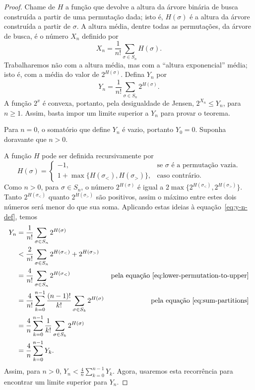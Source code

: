 \begin{proof}
    Chame de $H$ a função que devolve a altura da árvore binária de busca
    construída a partir de uma permutação dada;
    isto é, $H(\sigma)$ é a altura da árvore construída a partir de $\sigma$.
    A altura média,
    dentre todas as permutações,
    da árvore de busca,
    é o número $X_n$ definido por
    \begin{equation*}
        X_n = \frac{1}{n!} \sum_{\sigma \in S_n} H(\sigma).
    \end{equation*}
    Trabalharemos não com a altura média,
    mas com a ``altura exponencial'' média;
    isto é, com a média do valor de $2^{H(\sigma)}$.
    Defina $Y_n$ por
    \begin{equation}
        Y_n = \frac{1}{n!} \sum_{\sigma \in S_n} 2^{H(\sigma)}.
        \label{eq:y-n-def}
    \end{equation}
    A função $2^x$ é convexa,
    portanto,
    pela desigualdade de Jensen,
    $2^{X_n} \leq Y_n$,
    para $n \geq 1$.
    Assim, basta impor um limite superior a $Y_n$ para provar o teorema.

    Para $n = 0$, o somatório que define $Y_n$ é vazio,
    portanto $Y_0 = 0$.
    Suponha doravante que $n > 0$.

    A função $H$ pode ser definida recursivamente por
    \begin{equation*}
        H(\sigma) = \begin{cases}
            -1, & \text{se $\sigma$ é a permutação vazia.} \\
            1 + \max\{H(\sigma_<), H(\sigma_>)\}, & \text{caso contrário.}
        \end{cases}
    \end{equation*}
    Como $n > 0$, para $\sigma \in S_n$,
    o número $2^{H(\sigma)}$ é igual a $2 \max\{2^{H(\sigma_<)}, 2^{H(\sigma_>)}\}$.
    Tanto $2^{H(\sigma_<)}$ quanto $2^{H(\sigma_>)}$ são positivos,
    assim o máximo entre estes dois números será menor do que sua soma.
    Aplicando estas ideias à equação~\ref{eq:y-n-def},
    temos
    \begin{align*}
        Y_n &= \frac{1}{n!} \sum_{\sigma \in S_n} 2^{H(\sigma)} \\
            &< \frac{2}{n!} \sum_{\sigma \in S_n} 2^{H(\sigma_<)} + 2^{H(\sigma_>)} \\
            &= \frac{4}{n!} \sum_{\sigma \in S_n} 2^{H(\sigma_<)}
        &\text{pela equação~\ref{eq:lower-permutation-to-upper}} \\
        &= \frac{4}{n!} \sum_{k = 0}^{n-1}
            \frac{(n-1)!}{k!} \sum_{\sigma \in S_k} 2^{H(\sigma)}
            &\text{pela equação~\ref{eq:sum-partitions}} \\
        &= \frac{4}{n} \sum_{k = 0}^{n-1}
            \frac{1}{k!} \sum_{\sigma \in S_k} 2^{H(\sigma)} \\
        &= \frac 4 n \sum_{k = 0}^{n-1} Y_k.
    \end{align*}
    Assim, para $n > 0$, $Y_n < \frac 4 n \sum_{k = 0}^{n-1} Y_k$.
    Agora, usaremos esta recorrência para encontrar um limite superior para $Y_n$.


\end{proof}
